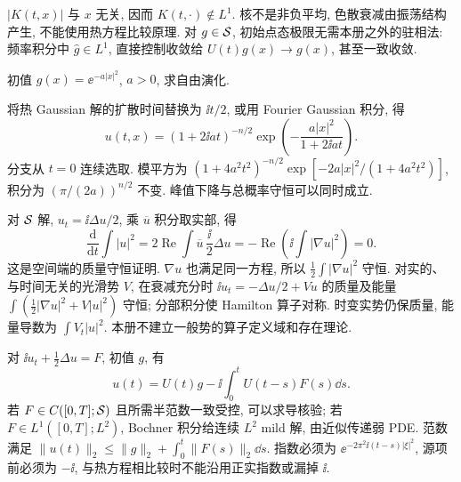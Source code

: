 $|K(t,x)|$ 与 $x$ 无关, 因而 $K(t,\cdot)\notin L^1$. 核不是非负平均, 色散衰减由振荡结构产生, 不能使用热方程比较原理. 对 $g\in\mathcal S$, 初始点态极限无需本册之外的驻相法: 频率积分中 $\widehat g\in L^1$, 直接控制收敛给 $U(t)g(x)\to g(x)$, 甚至一致收敛.
\begin{example}
初值 $g(x)=\ee^{-a|x|^2}$, $a>0$, 求自由演化.
\end{example}
\begin{solution}
将热 Gaussian 解的扩散时间替换为 $\ii t/2$, 或用 Fourier Gaussian 积分, 得
\[
u(t,x)=(1+2\ii at)^{-n/2}\exp\left(-\frac{a|x|^2}{1+2\ii at}\right).
\]
分支从 $t=0$ 连续选取. 模平方为 $(1+4a^2t^2)^{-n/2}\exp[-2a|x|^2/(1+4a^2t^2)]$, 积分为 $(\pi/(2a))^{n/2}$ 不变. 峰值下降与总概率守恒可以同时成立.
\end{solution}
对 $\mathcal S$ 解, $u_t=\ii\Delta u/2$, 乘 $\overline u$ 积分取实部, 得
\[
\frac{\mathrm d}{\mathrm dt}\int|u|^2=2\operatorname{Re}\int\overline u\,\frac{\ii}2\Delta u
=-\operatorname{Re}\left(\ii\int|\nabla u|^2\right)=0.
\]
这是空间端的质量守恒证明. $\nabla u$ 也满足同一方程, 所以 $\frac12\int|\nabla u|^2$ 守恒. 对实的、与时间无关的光滑势 $V$, 在衰减充分时 $\ii u_t=-\Delta u/2+Vu$ 的质量及能量 $\int(\tfrac12|\nabla u|^2+V|u|^2)$ 守恒; 分部积分使 Hamilton 算子对称. 时变实势仍保质量, 能量导数为 $\int V_t|u|^2$. 本册不建立一般势的算子定义域和存在理论.

对 $\ii u_t+\tfrac12\Delta u=F$, 初值 $g$, 有
\begin{equation}\label{eq:duhamelschro}
u(t)=U(t)g-\ii\int_0^tU(t-s)F(s)\dd s.
\end{equation}
若 $F\in C([0,T];\mathcal S)$ 且所需半范数一致受控, 可以求导核验; 若 $F\in L^1([0,T];L^2)$, Bochner 积分给连续 $L^2$ mild 解, 由近似传递弱 PDE. 范数满足 $\|u(t)\|_2\le\|g\|_2+\int_0^t\|F(s)\|_2\dd s$. 指数必须为 $\ee^{-2\pi^2\ii(t-s)|\xi|^2}$, 源项前必须为 $-\ii$, 与热方程相比较时不能沿用正实指数或漏掉 $\ii$.
